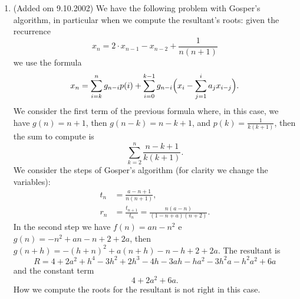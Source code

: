 \documentclass[a4paper]{article}
\begin{document}
\begin{enumerate}
\item (Added om 9.10.2002)
We have the following problem with Gosper's algorithm, in particular when
we compute the resultant's roots:
given the recurrence
\[
  x_n = 2 \cdot x_{n-1} - x_{n-2} + \frac1{n(n+1)}
\]
we use the formula 
\[
  x_n = \sum_{i=k}^n g_{n-i} p(i)
  +
  \sum_{i=0}^{k-1} g_{n-i} \Bigl( x_i - \sum_{j=1}^i a_j x_{i-j} \Bigr).
\]
We consider the first term of the previous formula where, in this case,
we have $g(n) = n + 1$, then $g(n-k) = n - k + 1$, and
$p(k) = \frac1{k(k+1)}$, then the sum to compute is
\[
  \sum_{k=2}^n \frac{n-k+1}{k(k+1)}.
\]
We consider the steps of Gosper's algorithm
(for clarity we change the variables):
\begin{align*}
  t_n &= \frac{a-n+1}{n(n+1)},\\
  r_n &= \frac{t_{n+1}}{t_n} = \frac{n(a-n)}{(1-n+a)(n+2)}.
\end{align*}
In the second step we have $f(n) = an - n^2$ e
$g(n) = -n^2 + an - n + 2 + 2a$, then
$g(n+h) = -(h+n)^2 + a(n+h) - n - h + 2 + 2a$.
The resultant is
\[
  R = 4 + 2a^2 + h^4 - 3h^2 + 2h^3 -4h -3ah - ha^2 -3h^2a -h^2a^2 + 6a
\]
and the constant term
\[
  4 + 2a^2 + 6a.
\]
How we compute the roots for the resultant is not right in this case.

\end{enumerate}
\end{document}

